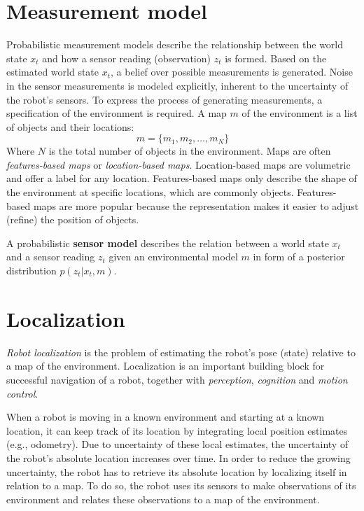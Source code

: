 		\section{Measurement model}
		\label{sec:measurement_model}
Probabilistic measurement models describe the relationship between the world state $x_t$ and how a sensor reading (observation) $z_t$ is formed.
Based on the estimated world state $x_t$, a belief over possible measurements is generated.
Noise in the sensor measurements is modeled explicitly, inherent to the uncertainty of the robot's sensors.
To express the process of generating measurements, a specification of the environment is required.
A map $m$ of the environment is a list of objects and their locations:
\begin{equation}
m = \{m_1, m_2, \hdots, m_N\}
\end{equation}
Where $N$ is the total number of objects in the environment.
Maps are often \textit{features-based maps} or \textit{location-based maps}.
Location-based maps are volumetric and offer a label for any location.
Features-based maps only describe the shape of the environment at specific locations, which are commonly objects.
Features-based maps are more popular because the representation makes it easier to adjust (refine) the position of objects.
\begin{mydef}
A probabilistic \textbf{sensor model} describes the relation between a world state $x_t$ and a sensor reading $z_t$ given an environmental model $m$ in form of a posterior distribution $p (z_t | x_t, m)$.
\end{mydef}


		\section{Localization}
\label{sec:probabilistic-robotics-localization}
\textit{Robot localization} is the problem of estimating the robot's pose (state) relative to a map of the environment.
Localization is an important building block for successful navigation of a robot, together with \textit{perception}, \textit{cognition} and \textit{motion control}.

When a robot is moving in a known environment and starting at a known location, it can keep track of its location by integrating local position estimates (e.g., odometry).
Due to uncertainty of these local estimates, the uncertainty of the robot's absolute location increases over time.
In order to reduce the growing uncertainty, the robot has to retrieve its absolute location by localizing itself in relation to a map.
To do so, the robot uses its sensors to make observations of its environment and relates these observations to a map of the environment.

